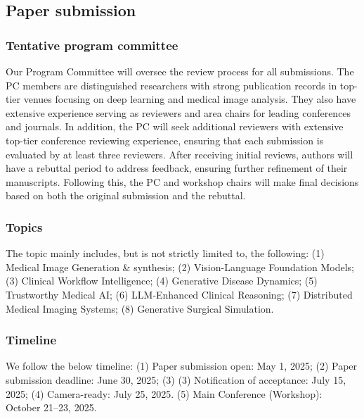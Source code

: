 \documentclass{article}
\newcommand\conf{ICCV 2025\xspace}
\def\c#1{\textcolor{gray}{#1}}
\begin{document}
\subsection{Paper submission}



\subsubsection{Tentative program committee}
Our Program Committee will oversee the review process for all submissions. The PC members are distinguished researchers with strong publication records in top-tier venues focusing on deep learning and medical image analysis. They also have extensive experience serving as reviewers and area chairs for leading conferences and journals. In addition, the PC will seek additional reviewers with extensive top-tier conference reviewing experience, ensuring that each submission is evaluated by at least three reviewers. 
%
After receiving initial reviews, authors will have a rebuttal period to address feedback, ensuring further refinement of their manuscripts. Following this, the PC and workshop chairs will make final decisions based on both the original submission and the rebuttal. 



\subsubsection{Topics}
The topic mainly includes, but is not strictly limited to, the following: (1) Medical Image Generation \& synthesis; (2) Vision-Language Foundation Models; (3) Clinical Workflow Intelligence; (4) Generative Disease Dynamics; (5) Trustworthy Medical AI; (6) LLM-Enhanced Clinical Reasoning; (7) Distributed Medical Imaging Systems; (8) Generative Surgical Simulation.

\subsubsection{Timeline}
We follow the below timeline: (1) Paper submission open: May 1, 2025; (2) Paper submission deadline: June 30, 2025; (3) (3) Notification of acceptance: July 15, 2025; (4) Camera-ready: July 25, 2025. (5) Main Conference (Workshop): October 21--23, 2025.
\end{document}
